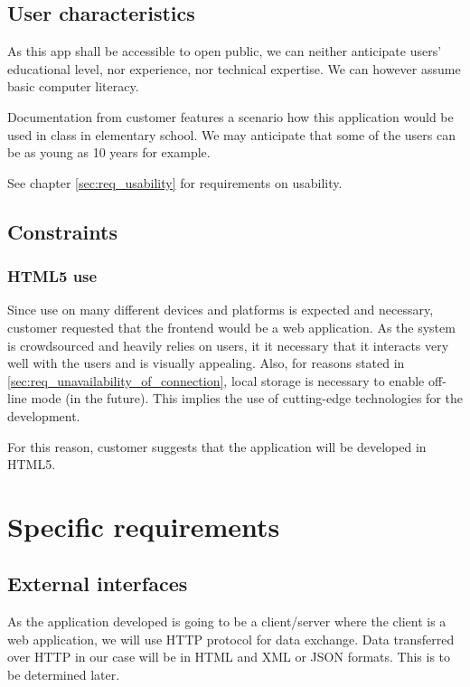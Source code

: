 \documentclass[11pt]{book}
\begin{document}
\subsection{User characteristics} \label{sec:req_user_characteristics}
As this app shall be accessible to open public, we can neither anticipate users' educational level, nor experience, nor technical expertise. We can however assume basic computer literacy.

Documentation from customer features a scenario how this application would be used in class in elementary school. We may anticipate that some of the users can be as young as 10 years for example.

See chapter \ref{sec:req_usability} for requirements on usability.

\subsection{Constraints}

\subsubsection{HTML5 use}
Since use on many different devices and platforms is expected and necessary, customer requested that the frontend would be a web application. As the system is crowdsourced and heavily relies on users, it it necessary that it interacts very well with the users and is visually appealing. Also, for reasons stated in \ref{sec:req_unavailability_of_connection}, local storage is necessary to enable off-line mode (in the future). This implies the use of cutting-edge technologies for the development.

For this reason, customer suggests that the application will be developed in HTML5.

\section{Specific requirements}\label{sec:req_specific_requirements}

\subsection{External interfaces}
As the application developed is going to be a client/server where the client is a web application, we will use HTTP protocol for data exchange. Data transferred over HTTP in our case will be in HTML and XML or JSON formats. This is to be determined later.
\end{document}
